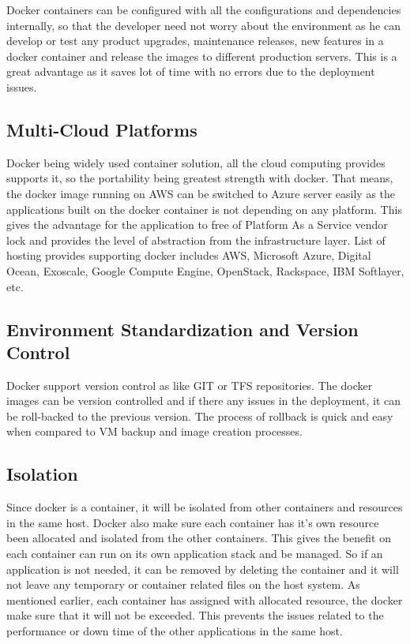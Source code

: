 \documentclass[sigconf]{acmart}
\begin{document}
	Docker containers can be configured with all the configurations and dependencies internally, so that the developer need not worry about the environment as he can develop or test any product upgrades, maintenance releases, new features in a docker container and release the images to different production servers. This is a great advantage as it saves lot of time with no errors due to the deployment issues.\cite{Isolation}
	 
	\subsection{Multi-Cloud Platforms}
	Docker being widely used container solution, all the cloud computing provides supports it, so the portability being greatest strength with docker.
	That means, the docker image running on AWS can be switched to Azure server easily as the applications built on the docker container is not depending on any platform. This gives the advantage for the application to free of Platform As a Service vendor lock and provides the level of abstraction from the infrastructure layer.
	List of hosting provides supporting docker includes AWS, Microsoft Azure, Digital Ocean, Exoscale, Google Compute Engine, OpenStack, Rackspace, IBM Softlayer, etc.
	\cite{MultiCloudPlatform}
	\subsection{Environment Standardization and Version Control}
	Docker support version control as like GIT or TFS repositories. The docker images can be version controlled and if there any issues in the deployment, it can be roll-backed to the previous version. The process of rollback is quick and easy when compared to VM backup and image creation processes.\cite{Isolation}
	\subsection{Isolation}
	
	Since docker is a container, it will be isolated from other containers and resources in the same host. Docker also make sure each container has it's own resource been allocated and isolated from the other containers. This gives the benefit on each container can run on its own application stack and be managed. So if an application is not needed, it can be removed by deleting the container and it will not leave any temporary or container related files on the host system.
	As mentioned earlier, each container has assigned with allocated resource, the docker make sure that it will not be exceeded. This prevents the issues related to the performance or down time of the other applications in the same host.\cite{Isolation}
\end{document}
